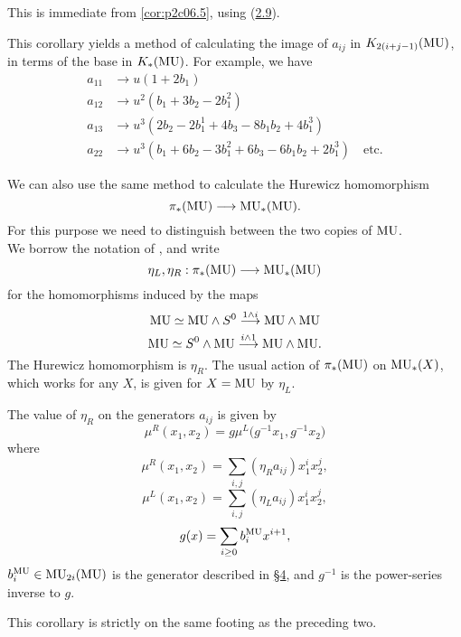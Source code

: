 \documentclass[../main]{subfiles}
\begin{document}
This is immediate from \eqref{cor:p2c06.5}, using (\hyperref[ex:p2c02.9]{2.9}).

This corollary yields a method of calculating the image of $a_{ij}$ in $K_{2(i+j-1)}(\mathrm{MU})$, in terms of the base in $K_\ast(\mathrm{MU})$. For example, we have 
\begin{align*}
    a_{11} &\longrightarrow u(1+2b_1)  \\
    a_{12} &\longrightarrow u^2(b_1+3b_2-2b_1^2)  \\ 
    a_{13} &\longrightarrow u^3(2b_2-2b_1^1+4b_3-8b_1b_2+4b_1^3)  \\
    a_{22} &\longrightarrow u^3(b_1+6b_2-3b_1^2+6b_3-6b_1b_2+2b_1^3) \quad \text{etc.} 
\end{align*}

We can also use the same method to calculate the Hurewicz homomorphism
\[\pi_\ast(\mathrm{MU})\longrightarrow \mathrm{MU}_\ast(\mathrm{MU}).\]
For this purpose we need to distinguish between the two copies of $\mathrm{MU}$.\\
We borrow the notation of \cite{adams3}, and write
\[\eta_L,\eta_R:\pi_\ast(\mathrm{MU})\longrightarrow \mathrm{MU}_\ast(\mathrm{MU})\]
for the homomorphisms induced by the maps
\[\mathrm{MU}\simeq \mathrm{MU}\wedge S^0\overset{1\wedge i}{\longrightarrow} \mathrm{MU}\wedge \mathrm{MU}\]
\[\mathrm{MU}\simeq S^0\wedge \mathrm{MU}\overset{i\wedge 1}{\longrightarrow} \mathrm{MU}\wedge \mathrm{MU}.\]
The Hurewicz homomorphism is $\eta_R$. The usual action of $\pi_\ast(\mathrm{MU})$ on $\mathrm{MU}_\ast(X)$, which works for any $X$, is given for $X=\mathrm{MU}$ by $\eta_L$.
\begin{customcor}{6.8}
\label{cor:p2c06.8}
The value of $\eta_R$ on the generators $a_{ij}$ is given by 
\[\mu^R(x_1,x_2)=g\mu^L\big(g^{-1}x_1,g^{-1}x_2\big)\]
where 
\[\mu^R(x_1,x_2)=\sum_{i,j}(\eta_Ra_{ij})x_1^ix_2^j,\]
\[\mu^L(x_1,x_2)=\sum_{i,j}(\eta_La_{ij})x_1^ix_2^j,\]
\[g(x)=\sum_{i\geq 0}b_i^{\mathrm{MU}}x^{i+1},\]
$b_i^{\mathrm{MU}}\in \mathrm{MU}_{2i}(\mathrm{MU})$ is the generator described in \hyperref[sec:p2c4]{\S 4}, and $g^{-1}$ is the power-series inverse to $g$.
\end{customcor}

This corollary is strictly on the same footing as the preceding two.
\end{document}
